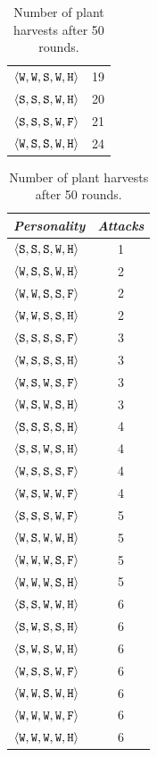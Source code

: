 \begin{table}
{{\begin{minipage}[b]{0.42\hsize}
\begin{tabular}{ l | c }
					$\personality{W}{W}{S}{W}{H}$ & 19\\
					$\personality{S}{S}{S}{W}{H}$ & 20\\
					$\personality{S}{S}{S}{W}{F}$ & 21\\
					$\personality{W}{S}{S}{W}{H}$ & 24\\
				\end{tabular}
				\caption{Number of plant harvests after 50 rounds.}
				\label{tab:numHarvests}
			\end{minipage}
			\hfill
			\begin{minipage}[b]{0.42\hsize}\centering
				\begin{tabular}{ l | c }
					\emph{Personality} & \emph{Attacks} \\
					\hline
						$\personality{S}{S}{S}{W}{H}$ & 1\\
						$\personality{W}{S}{S}{W}{H}$ & 2\\
						$\personality{W}{W}{S}{S}{F}$ & 2\\
						$\personality{W}{W}{S}{S}{H}$ & 2\\
						$\personality{S}{S}{S}{S}{F}$ & 3\\
						$\personality{W}{S}{S}{S}{H}$ & 3\\
						$\personality{W}{S}{W}{S}{F}$ & 3\\
						$\personality{W}{S}{W}{S}{H}$ & 3\\
						$\personality{S}{S}{S}{S}{H}$ & 4\\
						$\personality{S}{S}{W}{S}{H}$ & 4\\
						$\personality{W}{S}{S}{S}{F}$ & 4\\
						$\personality{W}{S}{W}{W}{F}$ & 4\\
						$\personality{S}{S}{S}{W}{F}$ & 5\\
						$\personality{W}{S}{W}{W}{H}$ & 5\\
						$\personality{W}{W}{W}{S}{F}$ & 5\\
						$\personality{W}{W}{W}{S}{H}$ & 5\\
						$\personality{S}{S}{W}{W}{H}$ & 6\\
						$\personality{S}{W}{S}{S}{H}$ & 6\\
						$\personality{S}{W}{S}{W}{H}$ & 6\\
						$\personality{W}{S}{S}{W}{F}$ & 6\\
						$\personality{W}{W}{S}{W}{H}$ & 6\\
						$\personality{W}{W}{W}{W}{F}$ & 6\\
						$\personality{W}{W}{W}{W}{H}$ & 6\\

\end{tabular}
\end{minipage}}}
\end{table}
